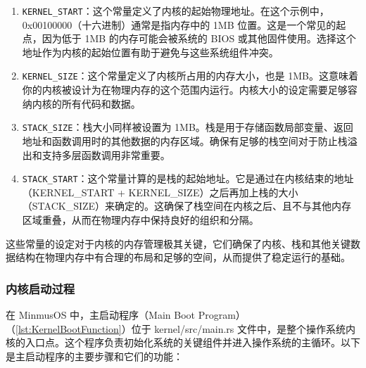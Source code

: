 \begin{enumerate}
    \item \texttt{KERNEL\_START}：这个常量定义了内核的起始物理地址。在这个示例中，0x00100000（十六进制）通常是指内存中的 1MB 位置。这是一个常见的起点，因为低于 1MB 的内存可能会被系统的 BIOS 或其他固件使用。选择这个地址作为内核的起始位置有助于避免与这些系统组件冲突。
    \item \texttt{KERNEL\_SIZE}：这个常量定义了内核所占用的内存大小，也是 1MB。这意味着你的内核被设计为在物理内存的这个范围内运行。内核大小的设定需要足够容纳内核的所有代码和数据。
    \item \texttt{STACK\_SIZE}：栈大小同样被设置为 1MB。栈是用于存储函数局部变量、返回地址和函数调用时的其他数据的内存区域。确保有足够的栈空间对于防止栈溢出和支持多层函数调用非常重要。
    \item \texttt{STACK\_START}：这个常量计算的是栈的起始地址。它是通过在内核结束的地址（KERNEL\_START + KERNEL\_SIZE）之后再加上栈的大小（STACK\_SIZE）来确定的。这确保了栈空间在内核之后、且不与其他内存区域重叠，从而在物理内存中保持良好的组织和分隔。
\end{enumerate}

这些常量的设定对于内核的内存管理极其关键，它们确保了内核、栈和其他关键数据结构在物理内存中有合理的布局和足够的空间，从而提供了稳定运行的基础。

\subsubsection{内核启动过程}

在 MinmusOS 中，主启动程序（Main Boot Program）（\cref{lst:KernelBootFunction}）位于 kernel/src/main.rs 文件中，是整个操作系统内核的入口点。这个程序负责初始化系统的关键组件并进入操作系统的主循环。以下是主启动程序的主要步骤和它们的功能：

